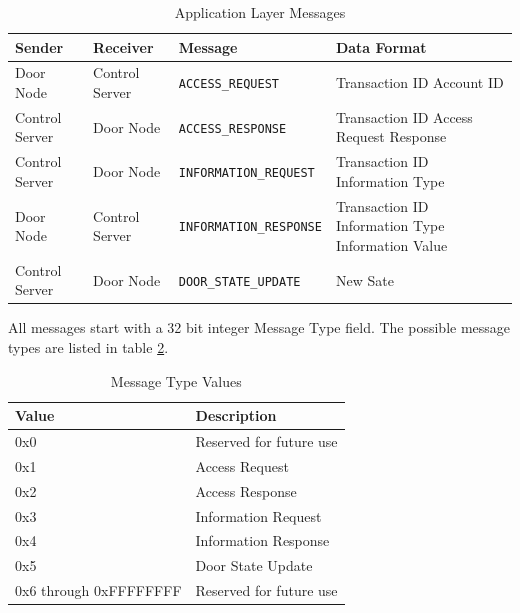 \begin{table}[htb]
\begin{tabular}{ l | l | l | p{4.5cm} }
\toprule
Sender & Receiver & Message & Data Format\\
\midrule
Door Node & Control Server & \verb|ACCESS_REQUEST| &
Transaction ID \newline Account ID\\
\hline
Control Server & Door Node & \verb|ACCESS_RESPONSE| &
Transaction ID \newline Access Request Response\\
\hline
Control Server & Door Node & \verb|INFORMATION_REQUEST| &
Transaction ID \newline Information Type\\
\hline
Door Node & Control Server & \verb|INFORMATION_RESPONSE| &
Transaction ID \newline Information Type \newline Information Value\\
\hline
Control Server & Door Node & \verb|DOOR_STATE_UPDATE| & New Sate\\
\bottomrule
\end{tabular}
\caption{Application Layer Messages}
\label{tab:app-layer-messages}
\end{table}

All messages start with a 32 bit integer Message Type field. The possible
message types are listed in table \ref{tab:message-types}.

\begin{table}[htb]
\centering
\begin{tabular}{@{}ll@{}}
\toprule
Value                   &   Description \\
\midrule
0x0                     &   Reserved for future use \\
0x1                     &   Access Request \\
0x2                     &   Access Response \\
0x3                     &   Information Request \\
0x4                     &   Information Response \\
0x5                     &   Door State Update \\
0x6 through 0xFFFFFFFF  &   Reserved for future use \\
\bottomrule
\end{tabular}
\caption{Message Type Values}
\label{tab:message-types}
\end{table}

